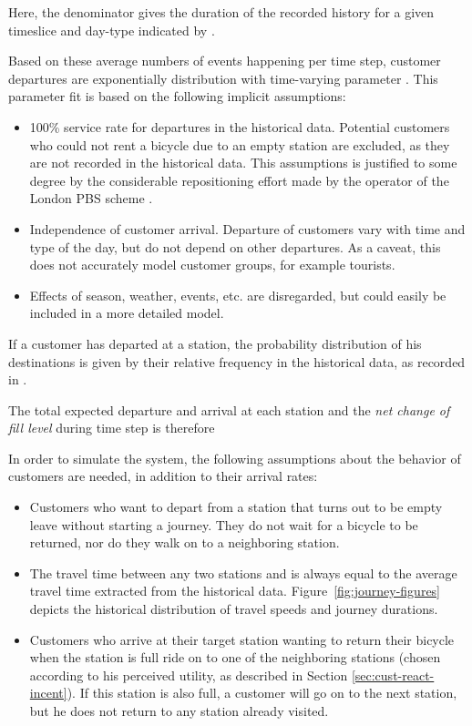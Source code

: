 \documentclass{article}
\begin{document}
Here, the denominator gives the duration of the recorded history for a given
timeslice and day-type indicated by .

Based on these average numbers of events happening per time step, customer
departures are exponentially distribution with time-varying parameter
. This parameter fit is based on the following implicit assumptions:
\begin{itemize}
\item 100\% service rate for departures in the historical data. Potential
  customers who could not rent a bicycle due to an empty station are excluded,
  as they are not recorded in the historical data. This assumptions is justified
  to some degree by the considerable repositioning effort made by the operator
  of the London PBS scheme \cite{stannard2011best}.
\item Independence of customer arrival. Departure of customers vary with time
  and type of the day, but do not depend on other departures. As a caveat, this
  does not accurately model customer groups, for example tourists.
\item Effects of season, weather, events, etc. are disregarded, but could easily be
  included in a more detailed model.
\end{itemize}
If a customer has departed at a station, the probability distribution of his
destinations is given by their relative frequency in the historical data, as
recorded in .

The total expected departure  and arrival  at each station and
the \emph{net change of fill level}  during time step  is therefore


In order to simulate the system, the following assumptions about the behavior of
customers are needed, in addition to their arrival rates:
\begin{itemize}
\item Customers who want to depart from a station that turns out to be empty leave without starting a journey. They do not wait for a bicycle to be
  returned, nor do they walk on to a neighboring station.
\item The travel time between any two stations  and  is always equal to
  the average travel time extracted from the historical data.
  Figure~\ref{fig:journey-figures} depicts the historical distribution of travel
  speeds and journey durations.
\item Customers who arrive at their target station wanting to return their
  bicycle when the station is full ride on to one of the neighboring stations
  (chosen according to his perceived utility, as described in Section
  \ref{sec:cust-react-incent}). If this station is also full, a customer will go
  on to the next station, but he does not return to any station already visited.
\end{itemize}
\end{document}
